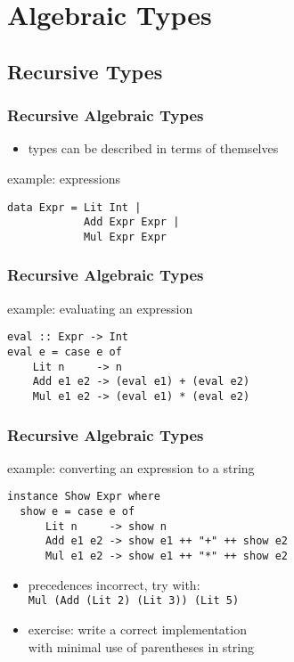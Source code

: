 \documentclass[dvipsnames]{beamer}
\theoremstyle{plain}
\begin{document}
\section{Algebraic Types}

\subsection{Recursive Types}

\begin{frame}[fragile]
  \frametitle{Recursive Algebraic Types}

  \begin{itemize}
    \item types can be described in terms of themselves
  \end{itemize}

  \begin{exampleblock}{example: expressions}
    \begin{lstlisting}
data Expr = Lit Int |
            Add Expr Expr |
            Mul Expr Expr
    \end{lstlisting}
  \end{exampleblock}
\end{frame}

\begin{frame}[fragile]
  \frametitle{Recursive Algebraic Types}

  \begin{exampleblock}{example: evaluating an expression}
    \begin{lstlisting}
eval :: Expr -> Int
eval e = case e of
    Lit n     -> n
    Add e1 e2 -> (eval e1) + (eval e2)
    Mul e1 e2 -> (eval e1) * (eval e2)
    \end{lstlisting}
  \end{exampleblock}
\end{frame}

\begin{frame}[fragile]
  \frametitle{Recursive Algebraic Types}

  \begin{exampleblock}{example: converting an expression to a string}
    \begin{lstlisting}
instance Show Expr where
  show e = case e of
      Lit n     -> show n
      Add e1 e2 -> show e1 ++ "+" ++ show e2
      Mul e1 e2 -> show e1 ++ "*" ++ show e2
    \end{lstlisting}
  \end{exampleblock}

  \pause
  \begin{itemize}
    \item precedences incorrect, try with:\\
      \lstinline|Mul (Add (Lit 2) (Lit 3)) (Lit 5)|
    \item exercise: write a correct implementation\\
      with minimal use of parentheses in string
  \end{itemize}
\end{frame}
\end{document}
